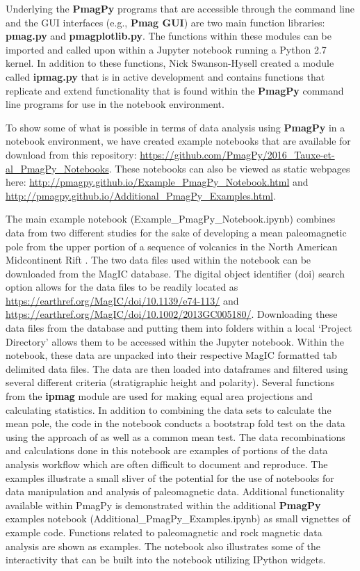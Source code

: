 \documentclass[11pt]{book}
\begin{document}
{{{{{{Underlying the {\bf PmagPy}  programs that are accessible through the command line and the GUI interfaces (e.g., {\bf Pmag GUI}) are two main function libraries: {\bf pmag.py} and {\bf pmagplotlib.py}. The functions within these modules can  be imported and called upon within a Jupyter notebook running a Python 2.7 kernel. In addition to these functions, Nick Swanson-Hysell created a module called {\bf ipmag.py} that is in active development and contains functions that replicate and extend functionality that is found within the {\bf PmagPy}  command line programs for use in the notebook environment.

To show some of what is possible in terms of data analysis using {\bf PmagPy} in a notebook environment, we have created example notebooks that are available for download from this repository: \url{https://github.com/PmagPy/2016_Tauxe-et-al_PmagPy_Notebooks}. These notebooks can also be viewed as static webpages here: \url{http://pmagpy.github.io/Example_PmagPy_Notebook.html} and \url{http://pmagpy.github.io/Additional_PmagPy_Examples.html}.

The main example notebook (Example\_PmagPy\_Notebook.ipynb) combines data from two different studies for the sake of developing a mean paleomagnetic pole from the upper portion of a sequence of volcanics in the North American Midcontinent Rift \citep{halls74, swansonhysell14}.  The two data files used within the notebook can be downloaded from the MagIC database. The digital object identifier (doi) search option allows for the data files to be readily located as  \url{https://earthref.org/MagIC/doi/10.1139/e74-113/} and \url{https://earthref.org/MagIC/doi/10.1002/2013GC005180/}. Downloading these data files from the database and putting them into folders within a local `Project Directory' allows them to be accessed within the Jupyter notebook. Within the notebook, these data are unpacked into their respective MagIC formatted tab delimited data files. The data are then loaded into dataframes and filtered using several different criteria (stratigraphic height and polarity).  Several functions from the {\bf ipmag} module are used for making equal area projections and calculating statistics. In addition to combining the data sets to calculate the mean pole, the code in the notebook conducts a bootstrap fold test on the data using the approach of \cite{tauxe94} as well as a common mean test. The data recombinations and calculations done in this notebook are examples of portions of the data analysis workflow which are often difficult to document and reproduce. The examples illustrate a small sliver of the potential for the use of notebooks for data manipulation and analysis of paleomagnetic data. Additional functionality available within PmagPy is demonstrated within the additional {\bf PmagPy} examples notebook (Additional\_PmagPy\_Examples.ipynb) as small vignettes of example code. Functions related to paleomagnetic and rock magnetic data analysis are shown as examples. The notebook also illustrates some of the interactivity that can be built into the notebook utilizing IPython widgets.

}}}}}}
\end{document}
